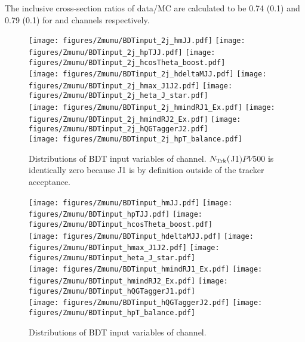 The inclusive cross-section ratios of data/MC are calculated to be 0.74 (0.1) and 0.79 (0.1) for \twocentral and \fourcentral channels respectively. 


\begin{figure}[htbp]
  \centering
 \texttt{[image: figures/Zmumu/BDTinput\_2j\_hmJJ.pdf]}
 \texttt{[image: figures/Zmumu/BDTinput\_2j\_hpTJJ.pdf]}
 \texttt{[image: figures/Zmumu/BDTinput\_2j\_hcosTheta\_boost.pdf]}\\
 \texttt{[image: figures/Zmumu/BDTinput\_2j\_hdeltaMJJ.pdf]}
 \texttt{[image: figures/Zmumu/BDTinput\_2j\_hmax\_J1J2.pdf]}
 \texttt{[image: figures/Zmumu/BDTinput\_2j\_heta\_J\_star.pdf]}\\
 \texttt{[image: figures/Zmumu/BDTinput\_2j\_hmindRJ1\_Ex.pdf]}
 \texttt{[image: figures/Zmumu/BDTinput\_2j\_hmindRJ2\_Ex.pdf]}
 \texttt{[image: figures/Zmumu/BDTinput\_2j\_hQGTaggerJ2.pdf]}\\
 \texttt{[image: figures/Zmumu/BDTinput\_2j\_hpT\_balance.pdf]}\\
\caption{Distributions of BDT input variables of \twocentral channel.  $N_{\rm Trk}($J1$)PV500$ is identically zero because J1 is by definition outside of the tracker acceptance.}
  \label{fig:ZmmBDTInputs2cen}
\end{figure}

\begin{figure}[htbp]
  \centering
 \texttt{[image: figures/Zmumu/BDTinput\_hmJJ.pdf]}
 \texttt{[image: figures/Zmumu/BDTinput\_hpTJJ.pdf]}
 \texttt{[image: figures/Zmumu/BDTinput\_hcosTheta\_boost.pdf]}\\
 \texttt{[image: figures/Zmumu/BDTinput\_hdeltaMJJ.pdf]}
 \texttt{[image: figures/Zmumu/BDTinput\_hmax\_J1J2.pdf]}
 \texttt{[image: figures/Zmumu/BDTinput\_heta\_J\_star.pdf]}\\
 \texttt{[image: figures/Zmumu/BDTinput\_hmindRJ1\_Ex.pdf]}
 \texttt{[image: figures/Zmumu/BDTinput\_hmindRJ2\_Ex.pdf]}
 \texttt{[image: figures/Zmumu/BDTinput\_hQGTaggerJ1.pdf]}\\
 \texttt{[image: figures/Zmumu/BDTinput\_hQGTaggerJ2.pdf]}
 \texttt{[image: figures/Zmumu/BDTinput\_hpT\_balance.pdf]}\\
\caption{Distributions of BDT input variables of \fourcentral channel. }
  \label{fig:ZmmBDTInputs4cen}
\end{figure}

